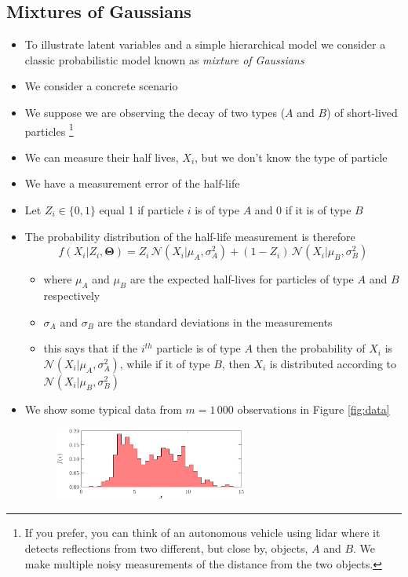 \documentclass[11pt]{article}
\newcommand{\normal}[2]{\mathcal{N}\!\left(#1 \big| #2 \right)}
\begin{document}
\subsection{Mixtures of Gaussians}
\label{sec:org92235d9}
\begin{itemize}
\item To illustrate latent variables and a simple hierarchical model
we consider a classic probabilistic model known as \emph{mixture of Gaussians}
\item We consider a concrete scenario
\item We suppose we are observing the decay of two types (\(A\) and
\(B\)) of short-lived particles \footnote{If you prefer, you can think of an autonomous vehicle using lidar
where it detects reflections from two different, but close by,
objects, \(A\) and \(B\).  We make multiple noisy measurements of the distance
from the two objects.}
\item We can measure their half lives, \(X_i\), but we don't know the type
of particle
\item We have a measurement error of the half-life
\item Let \(Z_i \in \{0,1\}\) equal 1 if  particle \(i\) is of type \(A\)
and 0 if it is of type \(B\)
\item The probability distribution of the half-life measurement is
therefore
$$ f(X_i|Z_i,\bm{\Theta}) = Z_i\,\normal{X_i}{\mu_A,\sigma_A^2} +
        (1-Z_i)\,\normal{X_i}{\mu_B,\sigma_B^2} $$
\begin{itemize}
\item where \(\mu_A\) and \(\mu_B\) are the expected half-lives for
particles of type \(A\) and \(B\) respectively
\item \(\sigma_A\) and \(\sigma_B\) are the standard deviations in the measurements
\item this says that if the \(i^{th}\) particle is of type \(A\)
then the probability of \(X_i\) is
\(\normal{X_i}{\mu_A,\sigma_A^2}\), while if it of type \(B\),
then \(X_i\) is distributed according to \(\normal{X_i}{\mu_B,\sigma_B^2}\)
\end{itemize}
\item We show some typical data  from \(m=1\,000\) observations in
Figure \ref{fig:data}
\begin{figure}[htbp]
\centering
\includegraphics[width=0.6\textwidth]{./figures/mog-0.pdf}

\end{figure}
\end{itemize}
\end{document}

